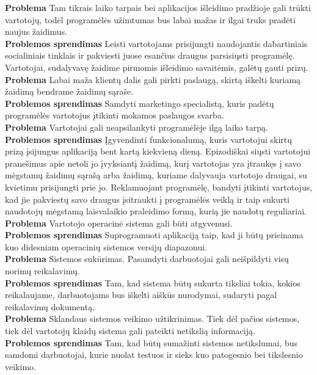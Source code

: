 \documentclass{VUMIFPSkursinis}
\begin{document}
		\noindent \textbf{Problema} Tam tikrais laiko tarpais bei aplikacijos išleidimo pradžioje gali trūkti vartotojų, todėl programėlės užimtumas bus labai mažas ir ilgai truks pradėti naujus žaidimus.\\
		\noindent \textbf{Problemos sprendimas} Leisti vartotojams prisijungti naudojantis dabartiniais socialiniais tinklais ir pakviesti juose esančius draugus parsisiųsti programėlę. Vartotojai, sudalyvavę žaidime pirmomis išleidimo savaitėmis, galėtų gauti prizų. \\
		
		\noindent \textbf{Problema} Labai maža klientų dalis gali pirkti paslaugą, skirtą iškelti kuriamą žaidimą bendrame žaidimų sąraše.\\
		\noindent \textbf{Problemos sprendimas} Samdyti marketingo specialistą, kuris padėtų programėlės vartotojus įtikinti mokamos paslaugos svarba. \\
		
		\noindent \textbf{Problema} Vartotojai gali neapsilankyti programėlėje ilgą laiko tarpą.\\
		\noindent \textbf{Problemos sprendimas} Įgyvendinti funkcionalumą, kuris vartotojui skirtų prizą įsijungus aplikaciją bent kartą kiekvieną dieną. Epizodiškai siųsti vartotojui pranešimus apie netoli jo įvyksiantį žaidimą, kurį vartotojas yra įtraukęs į savo mėgstamų žaidimų sąrašą arba žaidimą, kuriame dalyvauja vartotojo draugai, su kvietimu prisijungti prie jo. Reklamuojant programėlę, bandyti įtikinti vartotojus, kad jie pakviestų savo draugus įsitraukti į programėlės veiklą ir taip sukurti naudotojų mėgstamą laisvalaikio praleidimo formą, kurią jie naudotų reguliariai.\\
		
		\noindent \textbf{Problema} Vartotojo operacinė sistema gali būti atgyvenusi.\\
		\noindent \textbf{Problemos sprendimas} Suprogramuoti aplikaciją taip, kad ji būtų prieinama kuo didesniam operacinių sistemos versijų diapazonui.\\
		
		\noindent \textbf{Problema} Sistemos sukūrimas. Pasamdyti darbuotojai gali neišpildyti visų norimų reikalavimų.\\
		\noindent \textbf{Problemos sprendimas} Tam, kad sistema būtų sukurta tiksliai tokia, kokios reikalaujame, darbuotojams bus iškelti aiškūs nurodymai, sudaryti pagal reikalavimų dokumentą. \\
		
		\noindent \textbf{Problema} Sklandaus sistemos veikimo užtikrinimas. Tiek dėl pačios sistemos, tiek dėl vartotojų klaidų sistema gali pateikti netikslią informaciją. \\
		\noindent \textbf{Problemos sprendimas} Tam, kad būtų sumažinti sistemos netikslumai, bus samdomi darbuotojai, kurie nuolat testuos ir sieks kuo patogesnio bei tikslesnio veikimo.\\
		
\end{document}
